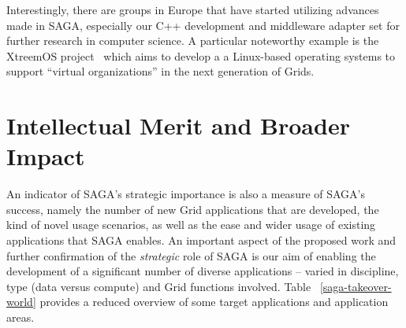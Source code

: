 \documentclass[10pt,letterpaper]{article}
\newcommand{\up}{\vspace*{-0.25em}}
\begin{document}


 Interestingly, there are groups in
Europe that have started utilizing advances made in SAGA, especially
our C++ development and middleware adapter set for further research in
computer science. A particular noteworthy example is the XtreemOS
project~\cite{xtreemos} which aims to develop a a Linux-based operating systems to support
``virtual organizations'' in the next generation of Grids.

\section{Intellectual Merit and Broader Impact}

\up\up

An indicator of SAGA's strategic importance is also a measure of
SAGA's success, namely the number of new Grid applications that are
developed, the kind of novel usage scenarios, as well as the ease and
wider usage of existing applications that SAGA enables.  An important
aspect of the proposed work and further confirmation of the {\it
  strategic} role of SAGA is our aim of enabling the development of a
significant number of diverse applications -- varied in discipline,
type (data versus compute) and Grid functions involved.  Table
~\ref{saga-takeover-world} provides a reduced overview of some target
applications and application areas.
\end{document}
